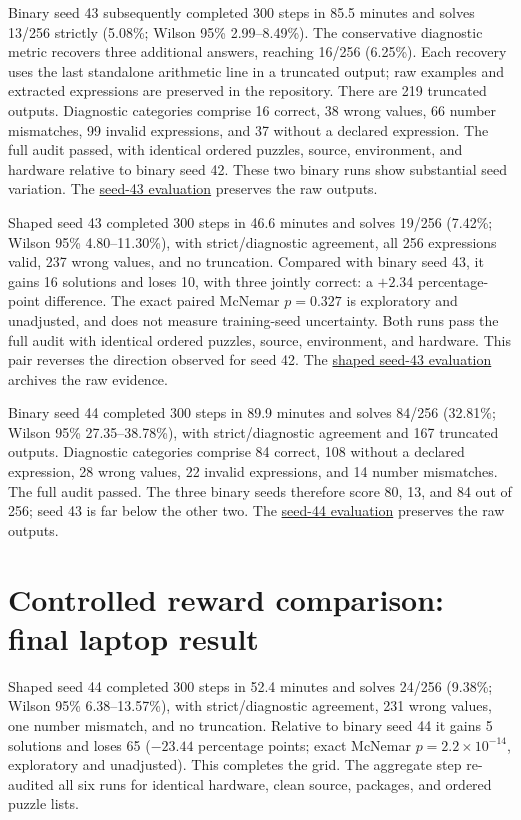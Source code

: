 \documentclass[11pt]{article}
\begin{document}
Binary seed 43 subsequently completed 300 steps in 85.5 minutes and solves
13/256 strictly (5.08\%; Wilson 95\% 2.99--8.49\%). The conservative diagnostic
metric recovers three additional answers, reaching 16/256 (6.25\%). Each
recovery uses the last standalone arithmetic line in a truncated output;
raw examples and extracted expressions are preserved in the repository.
There are 219 truncated outputs. Diagnostic categories comprise 16 correct,
38 wrong values, 66 number mismatches, 99 invalid expressions, and 37 without
a declared expression. The full audit passed, with identical ordered puzzles,
source, environment, and hardware relative to binary seed 42. These two binary
runs show substantial seed variation. The
\href{https://wandb.ai/mohamedsobhi777/countdown-grpo/runs/dmxcq1wh}{seed-43 evaluation}
preserves the raw outputs.

Shaped seed 43 completed 300 steps in 46.6 minutes and solves 19/256
(7.42\%; Wilson 95\% 4.80--11.30\%), with strict/diagnostic agreement,
all 256 expressions valid, 237 wrong values, and no truncation. Compared with
binary seed 43, it gains 16 solutions and loses 10, with three jointly correct:
a $+2.34$ percentage-point difference. The exact paired McNemar $p=0.327$
is exploratory and unadjusted, and does not measure training-seed uncertainty.
Both runs pass the full audit with identical ordered puzzles, source,
environment, and hardware. This pair reverses the direction observed for
seed 42.
The \href{https://wandb.ai/mohamedsobhi777/countdown-grpo/runs/f4jnc8d5}{shaped seed-43 evaluation}
archives the raw evidence.

Binary seed 44 completed 300 steps in 89.9 minutes and solves 84/256
(32.81\%; Wilson 95\% 27.35--38.78\%), with strict/diagnostic agreement and
167 truncated outputs. Diagnostic categories comprise 84 correct, 108 without a
declared expression, 28 wrong values, 22 invalid expressions, and 14 number
mismatches. The full audit passed. The three binary seeds therefore score 80,
13, and 84 out of 256; seed 43 is far below the other two. The
\href{https://wandb.ai/mohamedsobhi777/countdown-grpo/runs/80qr8909}{seed-44 evaluation}
preserves the raw outputs.

\section{Controlled reward comparison: final laptop result}
Shaped seed 44 completed 300 steps in 52.4 minutes and solves 24/256
(9.38\%; Wilson 95\% 6.38--13.57\%), with strict/diagnostic agreement,
231 wrong values, one number mismatch, and no truncation. Relative to binary
seed 44 it gains 5 solutions and loses 65 ($-23.44$ percentage points;
exact McNemar $p=2.2\times10^{-14}$, exploratory and unadjusted). This completes
the grid. The aggregate step re-audited all six runs for identical hardware,
clean source, packages, and ordered puzzle lists.
\end{document}
